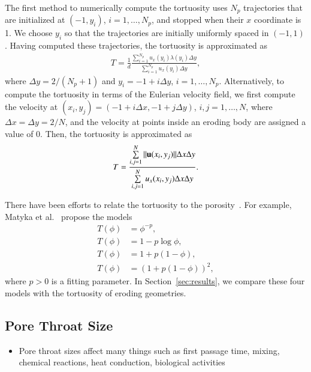 \documentclass[preprint, 10pt]{elsarticle}
\begin{document}
The first method to numerically compute the tortuosity uses $N_p$
trajectories that are initialized at $(-1,y_i)$, $i=1,\ldots,N_p$, and
stopped when their $x$ coordinate is 1.  We choose $y_i$ so that the
trajectories are initially uniformly spaced in $(-1,1)$.  Having
computed these trajectories, the tortuosity is approximated as
\begin{align}
  T = \frac{1}{d}\frac{\displaystyle\sum_{i=1}^{N_p} 
    u_x(y_i) \lambda(y_i) \Delta y}
  {\displaystyle\sum_{i=1}^{N_p} u_x(y_i) \Delta y}, 
\end{align}
where $\Delta y = 2/(N_p + 1)$ and $y_i = -1 + i \Delta y$,
$i=1,\ldots,N_p$.  Alternatively, to compute the tortuosity in terms of
the Eulerian velocity field, we first compute the velocity at $(x_i,y_j)
= (-1 + i\Delta x, -1 + j\Delta y)$, $i,j=1,\ldots,N$, where $\Delta x =
\Delta y = 2/N$, and the velocity at points inside an eroding body are
assigned a value of 0.  Then, the tortuosity is approximated as
\begin{align}
  T = \frac{\sum\limits_{i,j=1}^N \|{\mathbf{u}}(x_i,y_j)\|\Delta x \Delta y}
      {\sum\limits_{i,j=1}^N u_x(x_i,y_j) \Delta x \Delta y}.
\end{align}

There have been efforts to relate the tortuosity to the
porosity~\cite{matyka2008tortuosity}.  For example, Matyka et
al.~\cite{matyka2008tortuosity} propose the models
\begin{align}
  T(\phi) &= \phi^{-p}, \\
  T(\phi) &= 1-p \log \phi, \\
  T(\phi) &= 1+p (1-\phi), \\
  T(\phi) &= (1+p (1-\phi))^2, 
\end{align}
where $p>0$ is a fitting parameter.  In Section~\ref{sec:results}, we
compare these four models with the tortuosity of eroding geometries.

\subsection{Pore Throat Size}
\begin{itemize}
  \item Pore throat sizes affect many things such as first passage time,
  mixing, chemical reactions, heat conduction, biological activities
\end{itemize}
\end{document}
